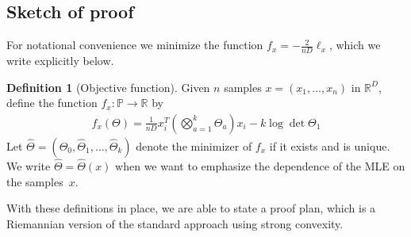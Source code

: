 \documentclass[aos]{imsart}
\theoremstyle{definition}
\newtheorem{definition}[theorem]{Definition}
\numberwithin{equation}{section}
\newcommand{\R}{{\mathbb{R}}}
\renewcommand{\P}{{\mathbb{P}}}
\newcommand{\samp}{x}
\newcommand{\ef}{f}
\begin{document}
\subsection{Sketch of proof}\label{subsec:proof-sketch}
For notational convenience we minimize the function $\ef_\samp = - \frac{2}{nD} \ell_x$, which we write explicitly below.
\begin{definition}[Objective function]\label{dfn:function}
Given $n$ samples $x = (x_1,\dots,x_n)$ in $\R^D$, define the function $f_x \colon \P \to \R$ by
\begin{align*}
  \ef_\samp(\Theta)
=  \frac{1}{nD}\samp_i^T \left( \textstyle \bigotimes_{a=1}^k \Theta_a \right) \samp_i - k \log\det \Theta_1
\end{align*}
Let $\widehat \Theta = (\widehat \Theta_0, \widehat \Theta_1,\dots,\widehat \Theta_k)$ denote the minimizer of $f_x$ if it exists and is unique. We write $\widehat\Theta = \widehat\Theta(x)$ when we want to emphasize the dependence of the MLE on the samples~$x$.


\end{definition}






With these definitions in place, we are able to state a proof plan, which is a Riemannian version of the standard approach using strong convexity.
\end{document}
